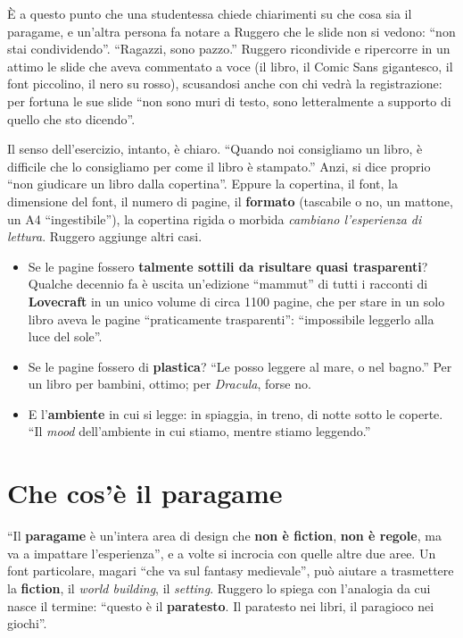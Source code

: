 È a questo punto che una studentessa chiede chiarimenti su che cosa sia il paragame, e
un'altra persona fa notare a Ruggero che le slide non si vedono: ``non stai
condividendo''. ``Ragazzi, sono pazzo.'' Ruggero ricondivide e ripercorre in un attimo
le slide che aveva commentato a voce (il libro, il Comic Sans gigantesco, il font
piccolino, il nero su rosso), scusandosi anche con chi vedrà la registrazione: per
fortuna le sue slide ``non sono muri di testo, sono letteralmente a supporto di quello
che sto dicendo''.

Il senso dell'esercizio, intanto, è chiaro. ``Quando noi consigliamo un libro, è
difficile che lo consigliamo per come il libro è stampato.'' Anzi, si dice proprio
``non giudicare un libro dalla copertina''. Eppure la copertina, il font, la dimensione
del font, il numero di pagine, il \textbf{formato} (tascabile o no, un mattone, un A4
``ingestibile''), la copertina rigida o morbida \emph{cambiano l'esperienza di
lettura}. Ruggero aggiunge altri casi.
\begin{itemize}
  \item Se le pagine fossero \textbf{talmente sottili da risultare quasi trasparenti}?
        Qualche decennio fa è uscita un'edizione ``mammut'' di tutti i racconti di
        \textbf{Lovecraft} in un unico volume di circa 1100 pagine, che per stare in un
        solo libro aveva le pagine ``praticamente trasparenti'': ``impossibile leggerlo
        alla luce del sole''.
  \item Se le pagine fossero di \textbf{plastica}? ``Le posso leggere al mare, o nel
        bagno.'' Per un libro per bambini, ottimo; per \emph{Dracula}, forse no.
  \item E l'\textbf{ambiente} in cui si legge: in spiaggia, in treno, di notte sotto le
        coperte. ``Il \emph{mood} dell'ambiente in cui stiamo, mentre stiamo
        leggendo.''
\end{itemize}

\section{Che cos'è il paragame}
\label{a10:sec:definizione}



``Il \textbf{paragame} è un'intera area di design che \textbf{non è fiction}, \textbf{non
è regole}, ma va a impattare l'esperienza'', e a volte si incrocia con quelle altre due
aree. Un font particolare, magari ``che va sul fantasy medievale'', può aiutare a
trasmettere la \textbf{fiction}, il \emph{world building}, il \emph{setting}. Ruggero lo
spiega con l'analogia da cui nasce il termine: ``questo è il \textbf{paratesto}. Il
paratesto nei libri, il paragioco nei giochi''.

